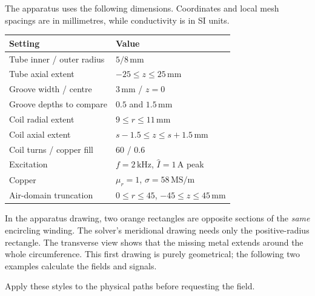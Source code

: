 The apparatus uses the following dimensions. Coordinates and local mesh
spacings are in millimetres, while conductivity is in SI units.
\begin{center}
\begin{tabular}{ll}
\toprule Setting & Value\\
\midrule
Tube inner / outer radius & $5/8\,\mathrm{mm}$\\
Tube axial extent & $-25\leq z\leq25\,\mathrm{mm}$\\
Groove width / centre & $3\,\mathrm{mm}$ / $z=0$\\
Groove depths to compare & $0.5$ and $1.5\,\mathrm{mm}$\\
Coil radial extent & $9\leq r\leq11\,\mathrm{mm}$\\
Coil axial extent & $s-1.5\leq z\leq s+1.5\,\mathrm{mm}$\\
Coil turns / copper fill & $60$ / $0.6$\\
Excitation & $f=2\,\mathrm{kHz}$, $\widehat I=1\,\mathrm A$ peak\\
Copper & $\mu_r=1$, $\sigma=58\,\mathrm{MS/m}$\\
Air-domain truncation & $0\leq r\leq45$, $-45\leq z\leq45\,\mathrm{mm}$\\
\bottomrule
\end{tabular}
\end{center}
In the apparatus drawing, two orange rectangles are opposite sections of the
\emph{same} encircling winding. The solver's meridional drawing needs only the
positive-radius rectangle. The transverse view shows that the missing metal
extends around the whole circumference. This first drawing is purely
geometrical; the following two examples calculate the fields and signals.


\begin{codeexample}
\usetikzlibrary{patterns,arrows.meta}
\end{codeexample}

Apply these styles to the physical paths before requesting the field.


